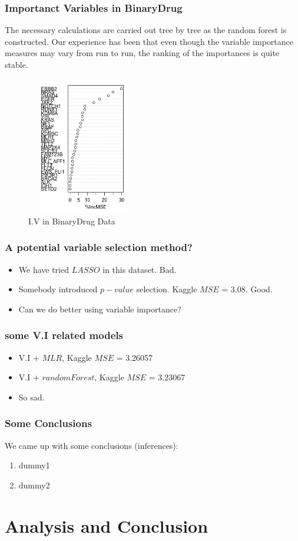 \documentclass{beamer}
\begin{document}
\begin{frame}
\frametitle{Importanct Variables in BinaryDrug}
The necessary calculations are carried out tree by tree as the random forest is constructed. Our experience has been that even though the variable importance measures may vary from run to run, the ranking of the importances is quite stable.
\begin{figure}[h]
	\includegraphics[width=5cm, height=6cm]{bagging_vi}
	\caption{I.V in BinaryDrug Data}
\end{figure}
\end{frame}



\begin{frame}
\frametitle{A potential variable selection method?}
\begin{itemize}
	\item We have tried $LASSO$ in this dataset. Bad.
	
	\item Somebody introduced $p-value$ selection. Kaggle $MSE$ = 3.08. Good.
	
	\item Can we do better using variable importance?
\end{itemize}
\end{frame}

\begin{frame}
\frametitle{some V.I related models}
\begin{itemize}
	\item V.I + $MLR$, Kaggle $MSE$ = 3.26057
	\pause
	\item V.I + $randomForest$, Kaggle $MSE$ = 3.23067\\
	\pause
	\item So sad.
\end{itemize}
\end{frame}




\begin{frame}
\frametitle{Some Conclusions}
We came up with some conclusions (inferences):
\begin{enumerate}[<+(1)->]
	\item dummy1
	\item dummy2
\end{enumerate}
\end{frame}


\section{Analysis and Conclusion}
\end{document}
